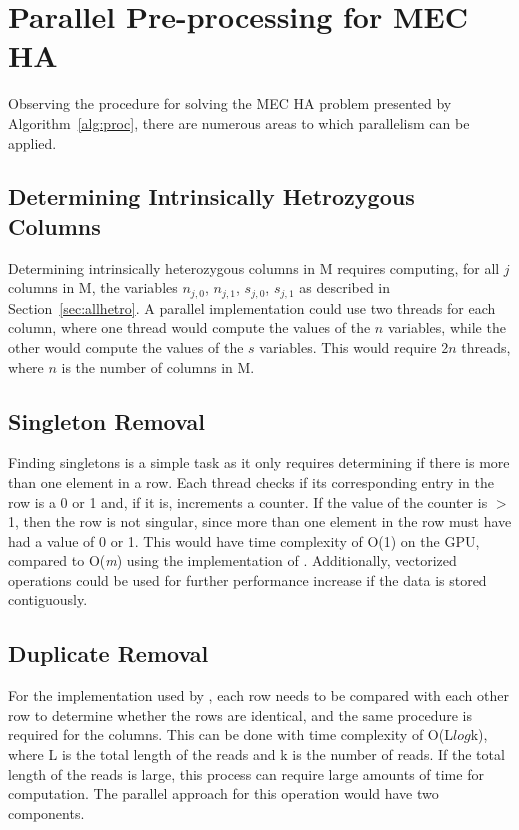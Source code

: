 \documentclass[10pt,twocolumn]{article}
\begin{document}

\section{Parallel Pre-processing for MEC HA } \label{sec:parpre}

Observing the procedure for solving the MEC HA problem presented by Algorithm~\ref{alg:proc}, there are 
numerous areas to which parallelism can be applied.

\subsection{ Determining Intrinsically Hetrozygous Columns}

Determining intrinsically heterozygous columns in M requires computing, for all $j$ columns in M, the
variables $n_{j,0}$, $n_{j,1}$, $s_{j,0}$, $s_{j,1}$ as described in Section~\ref{sec:allhetro}.
A parallel implementation could use two threads for each column, where one thread would compute the values of the
$n$ variables, while the other would compute the values of the $s$ variables. This would require 2$n$ threads,
where $n$ is the number of columns in M.

\subsection{Singleton Removal}

Finding singletons is a simple task as it only requires determining if there is more than one element in a
row. Each thread checks if  its corresponding entry in the row is a 0 or 1 and, if it is, increments a
counter. If the value of the counter is $>$ 1, then the row is not singular, since more than one element in 
the row must have had a value of 0 or 1. This would have time complexity of O(1) on the GPU, compared to 
O(\textit{m}) using the implementation of \cite{chen:2013}. Additionally, vectorized operations could be used
for further performance increase if the data is stored contiguously.

\subsection{Duplicate Removal}

For the implementation used by \cite{chen:2013}, each row needs to be compared with each other row to
determine whether the rows are identical, and the same procedure is required for the columns. This can be done with
time complexity of O(L$log$k), where L is the total length of the reads and k is the number of reads. If the
total length of the reads is large, this process can require large amounts of time for computation. The 
parallel approach for this operation would have two components.
\end{document}
